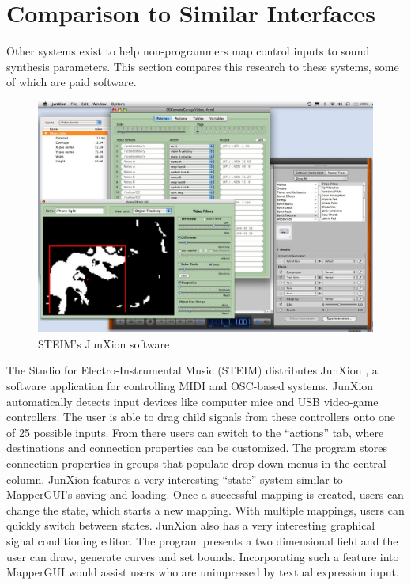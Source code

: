 

\section{Comparison to Similar Interfaces} %
\label{sec:comparison_to_similar_interfaces}

Other systems exist to help non-programmers map control inputs to sound synthesis parameters. This section compares this research to these systems, some of which are paid software.

\begin{figure}[h]
	\centering
		\includegraphics[width=\textwidth]{figures/junXion_v4}
		\caption{STEIM's JunXion software}
		\label{fig:junxion}
\end{figure}

The Studio for Electro-Instrumental Music (STEIM) distributes JunXion \cite{junxion}, a software application for controlling MIDI and OSC-based systems. JunXion automatically detects input devices like computer mice and USB video-game controllers. The user is able to drag child signals from these controllers onto one of 25 possible inputs.  From there users can switch to the ``actions'' tab, where destinations and connection properties can be customized. The program stores connection properties in groups that populate drop-down menus in the central column. JunXion features a very interesting ``state'' system similar to MapperGUI's saving and loading. Once a successful mapping is created, users can change the state, which starts a new mapping. With multiple mappings, users can quickly switch between states. JunXion also has a very interesting graphical signal conditioning editor. The program presents a two dimensional field and the user can draw, generate curves and set bounds. Incorporating such a feature into MapperGUI would assist users who are unimpressed by textual expression input.

